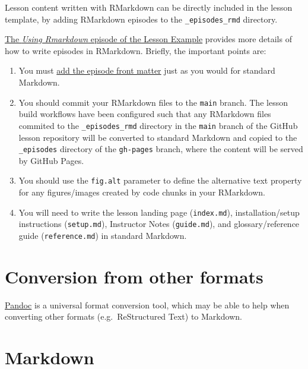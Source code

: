 \documentclass[
]{book}
\providecommand{\tightlist}{%
  \setlength{\itemsep}{0pt}\setlength{\parskip}{0pt}}
\begin{document}
Lesson content written with RMarkdown can be directly included in the lesson template, by adding RMarkdown episodes to the \texttt{\_episodes\_rmd} directory.

\href{https://carpentries.github.io/lesson-example/05-rmarkdown-example/}{The \emph{Using Rmarkdown} episode of the Lesson Example}
provides more details of how to write episodes in RMarkdown.
Briefly, the important points are:

\begin{enumerate}
\def\labelenumi{\arabic{enumi}.}
\tightlist
\item
  You must \protect\hyperlink{add-yaml-front-matter}{add the episode front matter}
  just as you would for standard Markdown.
\item
  You should commit your RMarkdown files to the \texttt{main} branch.
  The lesson build workflows have been configured such that
  any RMarkdown files commited to the \texttt{\_episodes\_rmd} directory
  in the \texttt{main} branch of the GitHub lesson repository
  will be converted to standard Markdown and copied to
  the \texttt{\_episodes} directory of the \texttt{gh-pages} branch,
  where the content will be served by GitHub Pages.
\item
  You should use the \texttt{fig.alt} parameter to define the alternative text
  property for any figures/images created by code chunks in your RMarkdown.
\item
  You will need to write the lesson landing page (\texttt{index.md}),
  installation/setup instructions (\texttt{setup.md}),
  Instructor Notes (\texttt{guide.md}),
  and glossary/reference guide (\texttt{reference.md})
  in standard Markdown.
\end{enumerate}

\hypertarget{conversion-from-other-formats}{%
\section{Conversion from other formats}\label{conversion-from-other-formats}}

\href{https://pandoc.org/}{Pandoc} is a universal format conversion tool,
which may be able to help when converting other formats
(e.g.~ReStructured Text) to Markdown.

\hypertarget{markdown}{%
\section{Markdown}\label{markdown}}
\end{document}
